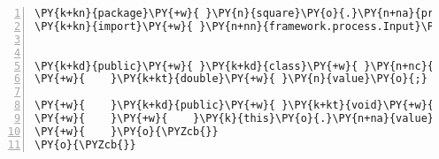 \begin{Verbatim}[commandchars=\\\{\},numbers=left,firstnumber=1,stepnumber=1,frame=single,fontsize=\small]
\PY{k+kn}{package}\PY{+w}{ }\PY{n}{square}\PY{o}{.}\PY{n+na}{process}\PY{o}{;}
\PY{k+kn}{import}\PY{+w}{ }\PY{n+nn}{framework.process.Input}\PY{o}{;}


\PY{k+kd}{public}\PY{+w}{ }\PY{k+kd}{class}\PY{+w}{ }\PY{n+nc}{ValueToBeSquared}\PY{+w}{ }\PY{k+kd}{implements}\PY{+w}{ }\PY{n}{Input}\PY{+w}{ }\PY{o}{\PYZob{}}
\PY{+w}{    }\PY{k+kt}{double}\PY{+w}{ }\PY{n}{value}\PY{o}{;}

\PY{+w}{    }\PY{k+kd}{public}\PY{+w}{ }\PY{k+kt}{void}\PY{+w}{ }\PY{n+nf}{setValue}\PY{o}{(}\PY{k+kt}{double}\PY{+w}{ }\PY{n}{value}\PY{o}{)}\PY{+w}{ }\PY{o}{\PYZob{}}
\PY{+w}{    }\PY{+w}{    }\PY{k}{this}\PY{o}{.}\PY{n+na}{value}\PY{+w}{ }\PY{o}{=}\PY{+w}{ }\PY{n}{value}\PY{o}{;}
\PY{+w}{    }\PY{o}{\PYZcb{}}
\PY{o}{\PYZcb{}}
\end{Verbatim}
